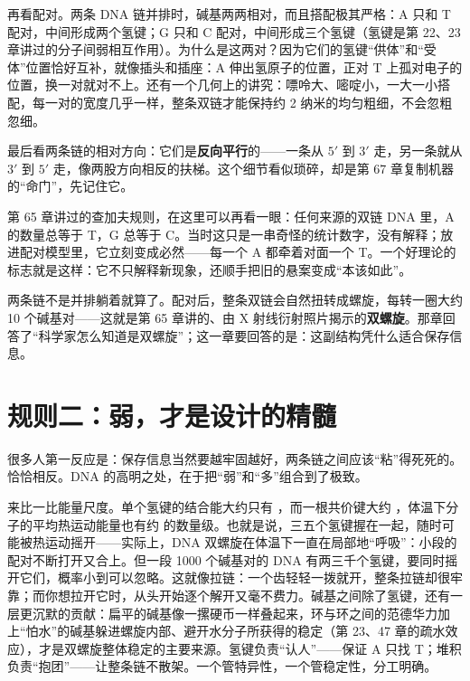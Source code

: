 再看配对。两条 DNA 链并排时，碱基两两相对，而且搭配极其严格：A 只和 T 配对，中间形成两个氢键；G 只和 C 配对，中间形成三个氢键（氢键是第 22、23 章讲过的分子间弱相互作用）。为什么是这两对？因为它们的氢键“供体”和“受体”位置恰好互补，就像插头和插座：A 伸出氢原子的位置，正对 T 上孤对电子的位置，换一对就对不上。还有一个几何上的讲究：嘌呤大、嘧啶小，一大一小搭配，每一对的宽度几乎一样，整条双链才能保持约 2 纳米的均匀粗细，不会忽粗忽细。

最后看两条链的相对方向：它们是\textbf{反向平行}的——一条从 $5'$ 到 $3'$ 走，另一条就从 $3'$ 到 $5'$ 走，像两股方向相反的扶梯。这个细节看似琐碎，却是第 67 章复制机器的“命门”，先记住它。

第 65 章讲过的查加夫规则，在这里可以再看一眼：任何来源的双链 DNA 里，A 的数量总等于 T，G 总等于 C。当时这只是一串奇怪的统计数字，没有解释；放进配对模型里，它立刻变成必然——每一个 A 都牵着对面一个 T。一个好理论的标志就是这样：它不只解释新现象，还顺手把旧的悬案变成“本该如此”。

两条链不是并排躺着就算了。配对后，整条双链会自然扭转成螺旋，每转一圈大约 10 个碱基对——这就是第 65 章讲的、由 X 射线衍射照片揭示的\textbf{双螺旋}。那章回答了“科学家怎么知道是双螺旋”；这一章要回答的是：这副结构凭什么适合保存信息。

\section{规则二：弱，才是设计的精髓}

很多人第一反应是：保存信息当然要越牢固越好，两条链之间应该“粘”得死死的。恰恰相反。DNA 的高明之处，在于把“弱”和“多”组合到了极致。

\begin{qiaoliang}
来比一比能量尺度。单个氢键的结合能大约只有 ，而一根共价键大约 ，体温下分子的平均热运动能量也有约  的数量级。也就是说，三五个氢键握在一起，随时可能被热运动摇开——实际上，DNA 双螺旋在体温下一直在局部地“呼吸”：小段的配对不断打开又合上。但一段 1000 个碱基对的 DNA 有两三千个氢键，要同时摇开它们，概率小到可以忽略。这就像拉链：一个齿轻轻一拨就开，整条拉链却很牢靠；而你想拉开它时，从头开始逐个解开又毫不费力。碱基之间除了氢键，还有一层更沉默的贡献：扁平的碱基像一摞硬币一样叠起来，环与环之间的范德华力加上“怕水”的碱基躲进螺旋内部、避开水分子所获得的稳定（第 23、47 章的疏水效应），才是双螺旋整体稳定的主要来源。氢键负责“认人”——保证 A 只找 T；堆积负责“抱团”——让整条链不散架。一个管特异性，一个管稳定性，分工明确。
\end{qiaoliang}

